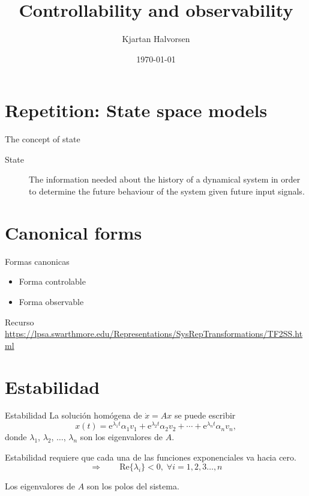 \documentclass[presentation,aspectratio=1610]{beamer}
\author{Kjartan Halvorsen}
\date{\today}
\title{Controllability and observability}
\begin{document}
\maketitle

\section{Repetition: State space models}
\label{sec:org53d648f}
\begin{frame}[label={sec:orge213076}]{The concept of state}
\begin{description}
\item[{State}] The information needed about the history of a dynamical system in order to determine the future behaviour of the system given future input signals.
\end{description}
\end{frame}

\section{Canonical forms}
\label{sec:org555dbad}

\begin{frame}[label={sec:org842c38c}]{Formas canonicas}
\begin{itemize}
\item Forma controlable
\item Forma observable
\end{itemize}

\begin{block}{Recurso}
\href{https://lpsa.swarthmore.edu/Representations/SysRepTransformations/TF2SS.html}{https://lpsa.swarthmore.edu/Representations/SysRepTransformations/TF2SS.html}
\end{block}
\end{frame}

\section{Estabilidad}
\label{sec:orgc5ad46e}

\begin{frame}[label={sec:orgdec9053}]{Estabilidad}
La solución homógena de \(\dot{x} = Ax\)  se puede escribir
\[ x(t) = \mathrm{e}^{\lambda_1 t}\alpha_1v_1 + \mathrm{e}^{\lambda_2 t}\alpha_2v_2 + \cdots + \mathrm{e}^{\lambda_n t}\alpha_nv_n,\]
donde \(\lambda_1\), \(\lambda_2\), \(\ldots\), \(\lambda_n\) son los \alert{eigenvalores} de \(A\). 

Estabilidad requiere que \alert{cada una} de las funciones exponenciales va hacia cero.
\[\Rightarrow \qquad \mathrm{Re}\{\lambda_i\} < 0, \; \forall i=1,2,3\ldots, n\]

Los eigenvalores de \(A\) son los \alert{polos} del sistema.
\end{frame}
\end{document}
